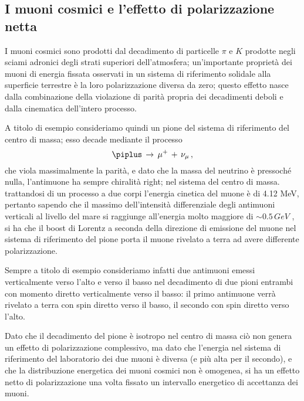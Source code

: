 \subsection{I muoni cosmici e l'effetto di polarizzazione netta}
I muoni cosmici sono prodotti dal decadimento di particelle $\pi$ e $K$ prodotte negli sciami adronici degli strati superiori dell'atmosfera; un'importante proprietà dei muoni di energia fissata osservati in un sistema di riferimento solidale alla superficie terrestre è la loro polarizzazione diversa da zero; questo effetto nasce dalla combinazione della violazione di parità propria dei decadimenti deboli e dalla cinematica dell'intero processo. \par
A titolo di esempio consideriamo quindi un pione del sistema di riferimento del centro di massa; esso decade mediante il processo
\begin{equation}
	\piplus \, \to \, \mu^+ \, + \, \nu_{\mu} \, ,
	\label{eq:pi_decay}
\end{equation}
che viola massimalmente la parità, e dato che la massa del neutrino \`e pressoch\'e nulla, l'antimuone ha sempre chiralità right; nel sistema del centro di massa. trattandosi di un processo a due corpi l'energia cinetica del muone è di 4.12 MeV, pertanto sapendo che il massimo dell'intensità differenziale degli antimuoni verticali al livello del mare si raggiunge all'energia molto maggiore di $\sim 0.5 \, GeV$  \cite{bib:AJP-Amsler}, si ha che il boost di Lorentz a seconda della direzione di emissione del muone nel sistema di riferimento del pione porta il muone rivelato a terra ad avere differente polarizzazione. \par
Sempre a titolo di esempio consideriamo infatti due antimuoni emessi verticalmente verso l'alto e verso il basso nel decadimento di due pioni entrambi con momento diretto verticalmente verso il basso:
il primo antimuone verrà rivelato a terra con spin diretto verso il basso, il secondo con spin diretto verso l'alto. \par
Dato che il decadimento del pione è isotropo nel centro di massa ciò non genera un effetto di polarizzazione complessivo, ma dato che l'energia nel sistema di riferimento del laboratorio dei due muoni è diversa (e più alta per il secondo), e che la distribuzione energetica dei muoni cosmici non è omogenea, si ha un effetto netto di polarizzazione una volta fissato un intervallo energetico di accettanza dei muoni. \cite{bib:Lipari:1993hd} \par

 \par

